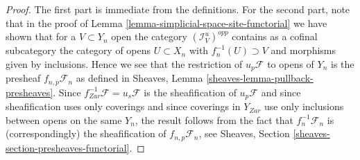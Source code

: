 \documentclass{stacks-project}
\theoremstyle{plain}
\theoremstyle{definition}
\theoremstyle{remark}
\numberwithin{equation}{subsection}
\begin{document}
\begin{proof}
The first part is immediate from the definitions. For the second part, note
that in the proof of
Lemma \ref{lemma-simplicial-space-site-functorial}
we have shown that for a $V \subset Y_n$ open the category
$(\mathcal{I}_V^u)^{opp}$ contains as a cofinal subcategory
the category of opens $U \subset X_n$ with $f_n^{-1}(U) \supset V$
and morphisms given by inclusions. Hence we see that the restriction
of $u_p\mathcal{F}$ to opens of $Y_n$ is the presheaf
$f_{n, p}\mathcal{F}_n$ as defined in
Sheaves, Lemma \ref{sheaves-lemma-pullback-presheaves}.
Since $f_{Zar}^{-1}\mathcal{F} = u_s\mathcal{F}$ is the sheafification
of $u_p\mathcal{F}$ and since sheafification uses only coverings and
since coverings in $Y_{Zar}$ use only inclusions between opens on the
same $Y_n$, the result follows from the fact that $f_n^{-1}\mathcal{F}_n$
is (correspondingly) the sheafification of $f_{n, p}\mathcal{F}_n$, see
Sheaves, Section \ref{sheaves-section-presheaves-functorial}.
\end{proof}
\end{document}
